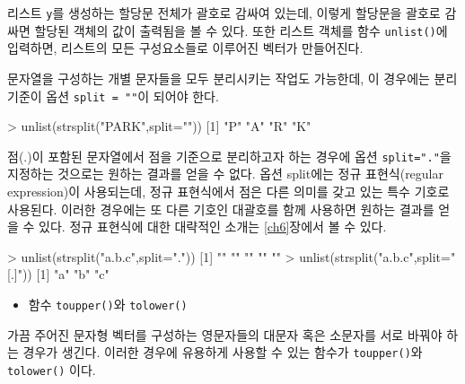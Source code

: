 \documentclass[
]{book}
\newenvironment{Shaded}{\begin{snugshade}}{\end{snugshade}}
\newcommand{\AttributeTok}[1]{\textcolor[rgb]{0.77,0.63,0.00}{#1}}
\newcommand{\DecValTok}[1]{\textcolor[rgb]{0.00,0.00,0.81}{#1}}
\newcommand{\FunctionTok}[1]{\textcolor[rgb]{0.00,0.00,0.00}{#1}}
\newcommand{\NormalTok}[1]{#1}
\newcommand{\SpecialCharTok}[1]{\textcolor[rgb]{0.00,0.00,0.00}{#1}}
\newcommand{\StringTok}[1]{\textcolor[rgb]{0.31,0.60,0.02}{#1}}
\providecommand{\tightlist}{%
  \setlength{\itemsep}{0pt}\setlength{\parskip}{0pt}}
\begin{document}
리스트 \texttt{y}를 생성하는 할당문 전체가 괄호로 감싸여 있는데, 이렇게 할당문을 괄호로 감싸면 할당된 객체의 값이 출력됨을 볼 수 있다. 또한 리스트 객체를 함수 \texttt{unlist()}에 입력하면, 리스트의 모든 구성요소들로 이루어진 벡터가 만들어진다.

문자열을 구성하는 개별 문자들을 모두 분리시키는 작업도 가능한데, 이 경우에는 분리
기준이 옵션 \texttt{split\ =\ ""}이 되어야 한다.

\begin{Shaded}
\begin{Highlighting}[]
\SpecialCharTok{\textgreater{}} \FunctionTok{unlist}\NormalTok{(}\FunctionTok{strsplit}\NormalTok{(}\StringTok{"PARK"}\NormalTok{,}\AttributeTok{split=}\StringTok{""}\NormalTok{))}
\NormalTok{[}\DecValTok{1}\NormalTok{] }\StringTok{"P"} \StringTok{"A"} \StringTok{"R"} \StringTok{"K"}
\end{Highlighting}
\end{Shaded}

점(.)이 포함된 문자열에서 점을 기준으로 분리하고자 하는 경우에 옵션 \texttt{split="."}을
지정하는 것으로는 원하는 결과를 얻을 수 없다. 옵션 split에는 정규 표현식(regular expression)이 사용되는데, 정규 표현식에서 점은 다른 의미를 갖고 있는 특수 기호로 사용된다. 이러한 경우에는 또 다른 기호인 대괄호를 함께 사용하면 원하는 결과를 얻을 수 있다. 정규 표현식에 대한 대략적인 소개는 \ref{ch6}장에서 볼 수 있다.

\begin{Shaded}
\begin{Highlighting}[]
\SpecialCharTok{\textgreater{}} \FunctionTok{unlist}\NormalTok{(}\FunctionTok{strsplit}\NormalTok{(}\StringTok{"a.b.c"}\NormalTok{,}\AttributeTok{split=}\StringTok{"."}\NormalTok{))}
\NormalTok{[}\DecValTok{1}\NormalTok{] }\StringTok{""} \StringTok{""} \StringTok{""} \StringTok{""} \StringTok{""}
\SpecialCharTok{\textgreater{}} \FunctionTok{unlist}\NormalTok{(}\FunctionTok{strsplit}\NormalTok{(}\StringTok{"a.b.c"}\NormalTok{,}\AttributeTok{split=}\StringTok{"[.]"}\NormalTok{))}
\NormalTok{[}\DecValTok{1}\NormalTok{] }\StringTok{"a"} \StringTok{"b"} \StringTok{"c"}
\end{Highlighting}
\end{Shaded}

\begin{itemize}
\tightlist
\item
  함수 \texttt{toupper()}와 \texttt{tolower()}
\end{itemize}

가끔 주어진 문자형 벡터를 구성하는 영문자들의 대문자 혹은 소문자를 서로 바꿔야 하는
경우가 생긴다. 이러한 경우에 유용하게 사용할 수 있는 함수가 \texttt{toupper()}와 \texttt{tolower()}
이다.
\end{document}
